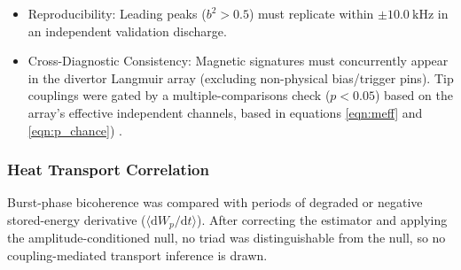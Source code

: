 \begin{itemize}
    \item Reproducibility: Leading peaks ($b^2 > 0.5$) must replicate within $\pm 10.0~\mathrm{kHz}$ in an independent validation discharge.
    \item Cross-Diagnostic Consistency: Magnetic signatures must concurrently appear in the divertor Langmuir array (excluding non-physical bias/trigger pins). Tip couplings were gated by a multiple-comparisons check ($p < 0.05$) based on the array's effective independent channels, based in equations  \ref{eqn:meff} and \ref{eqn:p_chance}) \cite{Bishop2023, Afyouni2019}.
\end{itemize}



\subsubsection{Heat Transport Correlation}
Burst-phase bicoherence was compared with periods of degraded or negative stored-energy derivative ($\langle \mathrm{d}W_p/\mathrm{d}t\rangle$). After correcting the estimator and applying the amplitude-conditioned null, no triad was distinguishable from the null, so no coupling-mediated transport inference is drawn.
